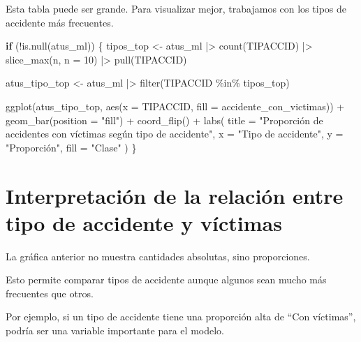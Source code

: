 \documentclass[
  11pt,
  letterpaper,
]{book}
\newenvironment{Shaded}{\begin{snugshade}}{\end{snugshade}}
\newcommand{\AttributeTok}[1]{\textcolor[rgb]{0.40,0.45,0.13}{#1}}
\newcommand{\ControlFlowTok}[1]{\textcolor[rgb]{0.00,0.23,0.31}{\textbf{#1}}}
\newcommand{\DecValTok}[1]{\textcolor[rgb]{0.68,0.00,0.00}{#1}}
\newcommand{\FunctionTok}[1]{\textcolor[rgb]{0.28,0.35,0.67}{#1}}
\newcommand{\NormalTok}[1]{\textcolor[rgb]{0.00,0.23,0.31}{#1}}
\newcommand{\OtherTok}[1]{\textcolor[rgb]{0.00,0.23,0.31}{#1}}
\newcommand{\SpecialCharTok}[1]{\textcolor[rgb]{0.37,0.37,0.37}{#1}}
\newcommand{\StringTok}[1]{\textcolor[rgb]{0.13,0.47,0.30}{#1}}
\begin{document}
Esta tabla puede ser grande. Para visualizar mejor, trabajamos con los
tipos de accidente más frecuentes.

\begin{Shaded}
\begin{Highlighting}[]
\ControlFlowTok{if}\NormalTok{ (}\SpecialCharTok{!}\FunctionTok{is.null}\NormalTok{(atus\_ml)) \{}
\NormalTok{  tipos\_top }\OtherTok{\textless{}{-}}\NormalTok{ atus\_ml }\SpecialCharTok{|\textgreater{}}
    \FunctionTok{count}\NormalTok{(TIPACCID) }\SpecialCharTok{|\textgreater{}}
    \FunctionTok{slice\_max}\NormalTok{(n, }\AttributeTok{n =} \DecValTok{10}\NormalTok{) }\SpecialCharTok{|\textgreater{}}
    \FunctionTok{pull}\NormalTok{(TIPACCID)}

\NormalTok{  atus\_tipo\_top }\OtherTok{\textless{}{-}}\NormalTok{ atus\_ml }\SpecialCharTok{|\textgreater{}}
    \FunctionTok{filter}\NormalTok{(TIPACCID }\SpecialCharTok{\%in\%}\NormalTok{ tipos\_top)}

  \FunctionTok{ggplot}\NormalTok{(atus\_tipo\_top, }\FunctionTok{aes}\NormalTok{(}\AttributeTok{x =}\NormalTok{ TIPACCID, }\AttributeTok{fill =}\NormalTok{ accidente\_con\_victimas)) }\SpecialCharTok{+}
    \FunctionTok{geom\_bar}\NormalTok{(}\AttributeTok{position =} \StringTok{"fill"}\NormalTok{) }\SpecialCharTok{+}
    \FunctionTok{coord\_flip}\NormalTok{() }\SpecialCharTok{+}
    \FunctionTok{labs}\NormalTok{(}
      \AttributeTok{title =} \StringTok{"Proporción de accidentes con víctimas según tipo de accidente"}\NormalTok{,}
      \AttributeTok{x =} \StringTok{"Tipo de accidente"}\NormalTok{,}
      \AttributeTok{y =} \StringTok{"Proporción"}\NormalTok{,}
      \AttributeTok{fill =} \StringTok{"Clase"}
\NormalTok{    )}
\NormalTok{\}}
\end{Highlighting}
\end{Shaded}

\section{Interpretación de la relación entre tipo de accidente y
víctimas}\label{interpretaciuxf3n-de-la-relaciuxf3n-entre-tipo-de-accidente-y-vuxedctimas}

La gráfica anterior no muestra cantidades absolutas, sino proporciones.

Esto permite comparar tipos de accidente aunque algunos sean mucho más
frecuentes que otros.

Por ejemplo, si un tipo de accidente tiene una proporción alta de ``Con
víctimas'', podría ser una variable importante para el modelo.
\end{document}
